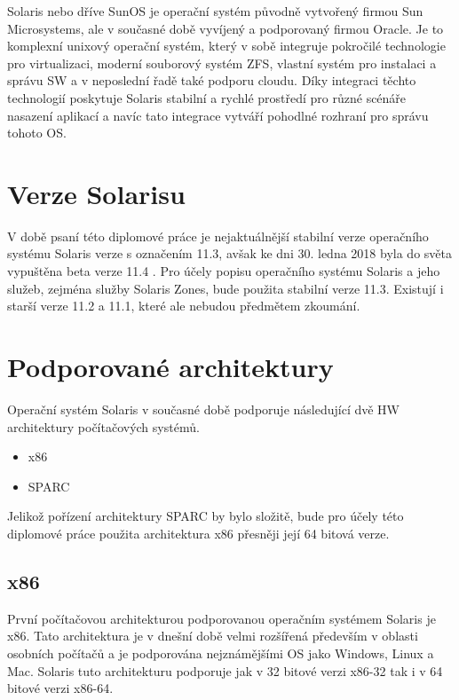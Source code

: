 Solaris nebo dříve SunOS je operační systém původně vytvořený firmou Sun Microsystems, ale v současné době vyvíjený a podporovaný firmou Oracle. Je to komplexní unixový operační systém, který v sobě integruje pokročilé technologie
pro virtualizaci, moderní souborový systém ZFS, vlastní systém pro instalaci a správu SW a v neposlední řadě také podporu cloudu. Díky integraci těchto technologií poskytuje Solaris stabilní a rychlé prostředí pro různé scénáře nasazení
aplikací a navíc tato integrace vytváří pohodlné rozhraní pro správu tohoto OS. 

\section{Verze Solarisu}

V době psaní této diplomové práce je nejaktuálnější stabilní verze operačního systému Solaris verze s označením 11.3, avšak ke dni 30. ledna 2018 byla do světa vypuštěna beta verze 11.4 \cite{solaris:beta_release}. Pro účely popisu operačního
systému Solaris a jeho služeb, zejména služby Solaris Zones, bude použita stabilní verze 11.3. Existují i starší verze 11.2 a 11.1, které ale nebudou předmětem zkoumání.

\section{Podporované architektury}

Operační systém Solaris v současné době podporuje následující dvě HW architektury počítačových systémů.

\begin{itemize}
 \item x86
 \item SPARC
\end{itemize}

Jelikož pořízení architektury SPARC by bylo složitě, bude pro účely této diplomové práce použita architektura x86 přesněji její 64 bitová verze.

\subsection{x86}

První počítačovou architekturou podporovanou operačním systémem Solaris je x86. Tato architektura je v dnešní době velmi rozšířená především v oblasti osobních počítačů a je podporována nejznámějšími OS jako Windows, Linux a Mac.
Solaris tuto architekturu podporuje jak v 32 bitové verzi x86-32 tak i v 64 bitové verzi x86-64.

